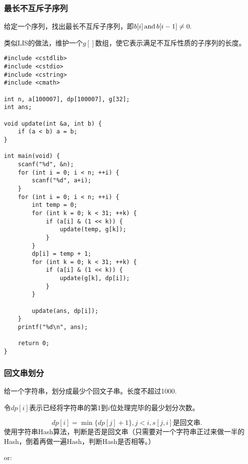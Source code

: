 \subsubsection{最长不互斥子序列}
给定一个序列，找出最长不互斥子序列，即$b[i]\operatorname{and} b[i-1]\neq 0.$

类似LIS的做法，维护一个$g[]$数组，使它表示满足不互斥性质的子序列的长度。
\begin{verbatim}
#include <cstdlib>
#include <cstdio>
#include <cstring>
#include <cmath>

int n, a[100007], dp[100007], g[32];
int ans;

void update(int &a, int b) {
    if (a < b) a = b;
}

int main(void) {
    scanf("%d", &n);
    for (int i = 0; i < n; ++i) {
        scanf("%d", a+i);
    }
    for (int i = 0; i < n; ++i) {
        int temp = 0;
        for (int k = 0; k < 31; ++k) {
            if (a[i] & (1 << k)) {
                update(temp, g[k]);
            }
        }
        dp[i] = temp + 1;
        for (int k = 0; k < 31; ++k) {
            if (a[i] & (1 << k)) {
                update(g[k], dp[i]);
            }
        }

        update(ans, dp[i]);
    }
    printf("%d\n", ans);

    return 0;
}
\end{verbatim}
\subsubsection{回文串划分}
给一个字符串，划分成最少个回文子串。长度不超过1000.

令$dp[i]$表示已经将字符串的第1到$i$位处理完毕的最少划分次数。

$$dp[i]=\min\{dp[j]+1\},j<i,s[j,i]是回文串.$$
使用字符串Hash算法，判断是否是回文串（只需要对一个字符串正过来做一半的Hash，倒着再做一遍Hash，判断Hash是否相等。）

or:

